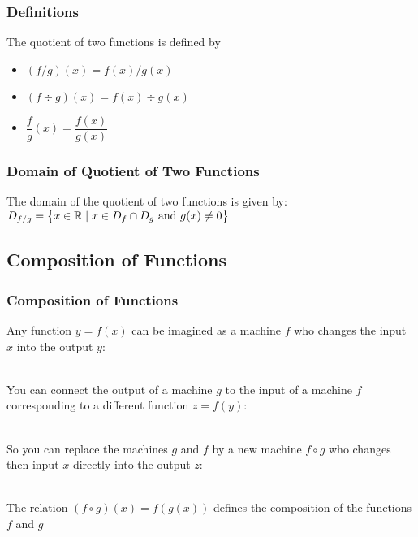 \documentclass{article}
\begin{document}
	\subsubsection{Definitions}
	The quotient of two functions is defined by
	\begin{itemize}
		\item $(f/g)(x)=f(x)/g(x)$
		\item $(f\div g)(x)=f(x)\div g(x)$
		\item $\dfrac{f}{g}(x)=\dfrac{f(x)}{g(x)}$
	\end{itemize}
	\subsubsection{Domain of Quotient of Two Functions}
	The domain of the quotient of two functions is given by: $D_{f/g}=\set{x\in\mathbb{R}\mid x\in D_f\cap D_g\text{ and }g(x)\neq0}$
	\subsection{Composition of Functions}
	\subsubsection{Composition of Functions}
	Any function $y=f(x)$ can be imagined as a machine $f$ who changes the input $x$ into the output $y$:\\
	\\
	You can connect the output of a machine $g$ to the input of a machine $f$ corresponding to a different function $z=f(y)$:\\
	\\
	So you can replace the machines $g$ and $f$ by a new machine $f\circ g$ who changes then input $x$ directly into the output $z$:\\
	\\
	The relation $(f\circ g)(x)=f(g(x))$ defines the composition of the functions $f$ and $g$
\end{document}
